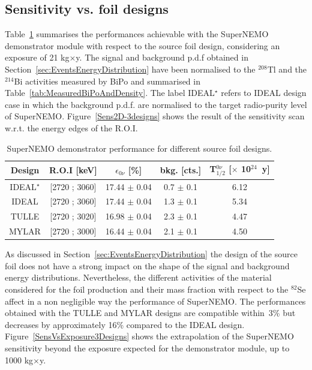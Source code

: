 \documentclass[main.tex]{subfiles}
\begin{document}
\FloatBarrier


\subsection{Sensitivity vs. foil designs}\label{sec:SensitivityVsDesign}


\NI Table~\ref{Tab:SNperformanceDiffDesign} summarises the performances achievable with the SuperNEMO demonstrator module with respect to the source foil design, considering an exposure of 21 kg$\times$y. The signal and background p.d.f obtained in Section~\ref{sec:EventsEnergyDistribution} have been normalised to the $^{\text{208}}$Tl and the $^{\text{214}}$Bi activities measured by BiPo and summarised in Table~\ref{tab:MeasuredBiPoAndDensity}. The label IDEAL$^\star$ refers to IDEAL design case in which the background p.d.f. are normalised to the target radio-purity level of SuperNEMO. Figure~\ref{Sens2D-3designs} shows the result of the sensitivity scan w.r.t. the energy edges of the R.O.I.


\begin{table}[h!]
\centering
\begin{tabular}{c|c|c|c|c}
\toprule
Design & R.O.I [keV] & $\epsilon_{\text{0}\nu}$ [\%] & bkg. [cts.] &   T$_{\text{1/2}}^{\text{0}\nu}$ [$\times$ 10$^{\text{24}}$~y] \\[0.1cm]
\hline
IDEAL$^{\star}$ & [2720 ; 3060] & 17.44 $\pm$ 0.04 & 0.7 $\pm$ 0.1 & 6.12 \\  [0.1cm]
\hline
IDEAL           & [2720 ; 3060] & 17.44 $\pm$ 0.04 & 1.3 $\pm$ 0.1 & 5.34 \\  [0.1cm]
\hline
TULLE           & [2720 ; 3020] & 16.98 $\pm$ 0.04 & 2.3 $\pm$ 0.1 & 4.47 \\  [0.1cm]
\hline
MYLAR           & [2720 ; 3000] & 16.44 $\pm$ 0.04 & 2.1 $\pm$ 0.1 & 4.50 \\  [0.1cm]
\bottomrule
\end{tabular}
\caption{SuperNEMO demonstrator performance for different source foil designs.}
\label{Tab:SNperformanceDiffDesign}
\end{table}


\NI As discussed in Section~\ref{sec:EventsEnergyDistribution} the design of the source foil does not have a strong impact on the shape of the signal and background energy distributions. Nevertheless, the different activities of the material considered for the foil production and their mass fraction with respect to the $^{\text{82}}$Se affect in a non negligible way the performance of SuperNEMO. The performances obtained with the TULLE and MYLAR designs are compatible within~3\% but decreases  by approximately 16\% compared to the IDEAL design. Figure~\ref{SensVsExposure3Designs} shows the extrapolation of the SuperNEMO sensitivity beyond the exposure expected for the demonstrator module, up to 1000 kg$\times$y.
\end{document}
